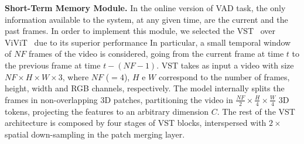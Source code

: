 \noindent\textbf{Short-Term Memory Module.}
In the online version of VAD task, the only information available to the system, at any given time, are the current and the past frames.
In order to implement this module, we selected  the VST~\cite{liu_video_2022} over ViViT~\cite{Arnab_2021_ICCV}  due to its superior performance 
In particular, a small temporal window of $\mathit{NF}$ frames of the video is considered, going from the current frame at time $t$ to the previous frame at time $t-\left(\mathit{NF}-1\right)$.
VST takes as input a video with size $\mathit{NF} \times H \times W \times 3$, where $\mathit{NF}$ ($=4$), $H$ e $W$ correspond to the number of frames, height, width and RGB channels, respectively.
The model internally splits the frames in non-overlapping 3D patches, partitioning the video in $\frac{\mathit{NF}}{2} \times \frac{H}{4} \times \frac{W}{4}$ 3D tokens, projecting the features to an arbitrary dimension $C$.
The rest of the VST architecture is composed by four stages of VST blocks, interspersed with $2\times$ spatial down-sampling in the patch merging layer.

